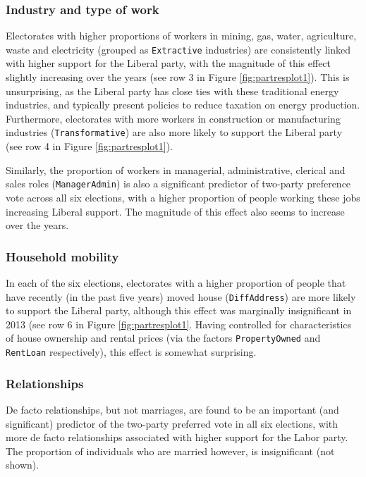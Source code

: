 \documentclass[11pt,a4paper,]{article}
\begin{document}
\hypertarget{industry-and-type-of-work}{%
\subsubsection{Industry and type of work}\label{industry-and-type-of-work}}

Electorates with higher proportions of workers in mining, gas, water, agriculture, waste and electricity (grouped as \texttt{Extractive} industries) are consistently linked with higher support for the Liberal party, with the magnitude of this effect slightly increasing over the years (see row 3 in Figure \ref{fig:partresplot1}). This is unsurprising, as the Liberal party has close ties with these traditional energy industries, and typically present policies to reduce taxation on energy production. Furthermore, electorates with more workers in construction or manufacturing industries (\texttt{Transformative}) are also more likely to support the Liberal party (see row 4 in Figure \ref{fig:partresplot1}).

Similarly, the proportion of workers in managerial, administrative, clerical and sales roles (\texttt{ManagerAdmin}) is also a significant predictor of two-party preference vote across all six elections, with a higher proportion of people working these jobs increasing Liberal support. The magnitude of this effect also seems to increase over the years.

\hypertarget{household-mobility}{%
\subsubsection{Household mobility}\label{household-mobility}}

In each of the six elections, electorates with a higher proportion of people that have recently (in the past five years) moved house (\texttt{DiffAddress}) are more likely to support the Liberal party, although this effect was marginally insignificant in 2013 (see row 6 in Figure \ref{fig:partresplot1}. Having controlled for characteristics of house ownership and rental prices (via the factors \texttt{PropertyOwned} and \texttt{RentLoan} respectively), this effect is somewhat surprising.

\hypertarget{relationships}{%
\subsubsection{Relationships}\label{relationships}}

De facto relationships, but not marriages, are found to be an important (and significant) predictor of the two-party preferred vote in all six elections, with more de facto relationships associated with higher support for the Labor party. The proportion of individuals who are married however, is insignificant (not shown).
\end{document}
